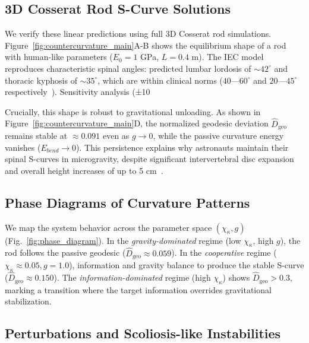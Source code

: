 \documentclass[11pt,a4paper]{article}
\begin{document}
\subsection{3D Cosserat Rod S-Curve Solutions}

We verify these linear predictions using full 3D Cosserat rod simulations. Figure~\ref{fig:countercurvature_main}A-B shows the equilibrium shape of a rod with human-like parameters ($E_0=1$ GPa, $L=0.4$ m). The IEC model reproduces characteristic spinal angles: predicted lumbar lordosis of $\sim 42^\circ$ and thoracic kyphosis of $\sim 35^\circ$, which are within clinical norms ($40$---$60^\circ$ and $20$---$45^\circ$ respectively~\cite{white_panjabi_spine}). Sensitivity analysis (±10%

Crucially, this shape is robust to gravitational unloading. As shown in Figure~\ref{fig:countercurvature_main}D, the normalized geodesic deviation $\widehat{D}_{\mathrm{geo}}$ remains stable at $\approx 0.091$ even as $g \to 0$, while the passive curvature energy vanishes ($E_{bend} \to 0$). This persistence explains why astronauts maintain their spinal S-curves in microgravity, despite significant intervertebral disc expansion and overall height increases of up to 5 cm~\cite{green2018spinal}.

\subsection{Phase Diagrams of Curvature Patterns}

We map the system behavior across the parameter space $(\chi_\kappa, g)$ (Fig.~\ref{fig:phase_diagram}). In the \emph{gravity-dominated} regime (low $\chi_\kappa$, high $g$), the rod follows the passive geodesic ($\widehat{D}_{\mathrm{geo}} \approx 0.059$). In the \emph{cooperative} regime ($\chi_\kappa \approx 0.05, g=1.0$), information and gravity balance to produce the stable S-curve ($\widehat{D}_{\mathrm{geo}} \approx 0.150$). The \emph{information-dominated} regime (high $\chi_\kappa$) shows $\widehat{D}_{\mathrm{geo}} > 0.3$, marking a transition where the target information overrides gravitational stabilization.

\subsection{Perturbations and Scoliosis-like Instabilities}
\end{document}
